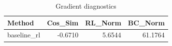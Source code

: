 \begin{table}[htbp]
\centering
\caption{Gradient diagnostics}
\label{tab:grad-diag}
\begin{tabular}{lrrr}
\toprule
\textbf{Method} & \textbf{Cos\_Sim} & \textbf{RL\_Norm} & \textbf{BC\_Norm} \\
\midrule
baseline\_rl & -0.6710 & 5.6544 & 61.1764 \\
\bottomrule
\end{tabular}
\end{table}